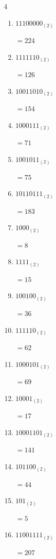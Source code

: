 \begin{multicols}{4}
\begin{enumerate}
  \item $11100000_{(2)}$

        $=224$

  \item $1111110_{(2)}$

        $=126$

  \item $10011010_{(2)}$

        $=154$

  \item $1000111_{(2)}$

        $=71$

  \item $1001011_{(2)}$

        $=75$

  \item $10110111_{(2)}$

        $=183$

  \item $1000_{(2)}$

        $=8$

  \item $1111_{(2)}$

        $=15$

  \item $100100_{(2)}$

        $=36$

  \item $111110_{(2)}$

        $=62$

  \item $1000101_{(2)}$

        $=69$

  \item $10001_{(2)}$

        $=17$

  \item $10001101_{(2)}$

        $=141$

  \item $101100_{(2)}$

        $=44$

  \item $101_{(2)}$

        $=5$

\columnbreak %

  \item $11001111_{(2)}$

        $=207$


\end{enumerate}
\end{multicols}
